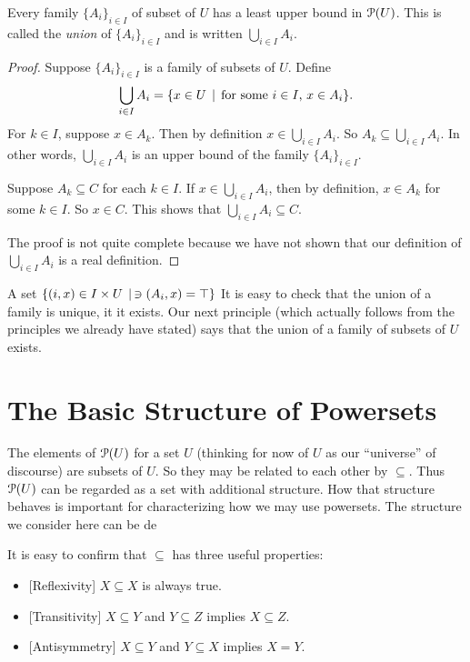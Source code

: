 \begin{lemma}
	Every family $\{A_i\}_{i\in I}$ of subset of $U$ has a least upper bound in ${\mathcal{P}}(U)$.
	This is called the \emph{union} of $\{A_i\}_{i\in I}$ and is written $\bigcup_{i\in I}A_i$.
	
	\begin{proof}
		Suppose $\{A_i\}_{i\in I}$ is a family of subsets of $U$. 
		Define 
		\[\bigcup_{i\in I}A_i = \{x\in U\,\mid\, \text{for some $i\in I$, $x\in A_i$}\}.\]
		For $k\in I$, suppose $x\in A_k$.
		Then by definition $x\in \bigcup_{i\in I}A_i$.
		So $A_k\subseteq \bigcup_{i\in I}A_i$.
		In other words, $\bigcup_{i\in I}A_i$ is an upper bound of the family $\{A_i\}_{i\in I}$.
		
		Suppose $A_k\subseteq C$ for each $k\in I$.
		If $x\in\bigcup_{i\in I}A_i$, then by definition, $x\in A_k$ for some $k\in I$.
		So $x\in C$.
		This shows that $\bigcup_{i\in I}A_i\subseteq C$.
		
		The proof is not quite complete because we have not shown that
		our definition of $\bigcup_{i\in I}A_i$ is a real definition.
	\end{proof}
\end{lemma}

A set $\{(i,x)\in I\times U\,\mid\, \ni(A_i,x)=\top\}$
It is easy to check that the union of a family is unique, it it exists. Our next principle (which actually follows from the principles we already have stated)
says that the union of a family of subsets of $U$ exists.



\section{The Basic Structure of Powersets}

The elements of ${\mathcal{P}}(U)$ for a set $U$ (thinking for now of $U$ as our
``universe'' of discourse) are subsets of $U$.
So they may be related to each other by $\subseteq$. 
Thus ${\mathcal{P}}(U)$ can be regarded as a set with additional structure. 
How that structure behaves is important for characterizing how we may use powersets. The structure we consider here can be de

It is easy to confirm that $\subseteq$ has three useful properties:
\begin{itemize}
	\item{}[Reflexivity] $X\subseteq X$ is always true.
	\item{}[Transitivity] $X\subseteq Y$ and $Y\subseteq Z$ implies $X\subseteq Z$.
	\item{}[Antisymmetry] $X\subseteq Y$ and $Y\subseteq X$ implies $X=Y$.
\end{itemize}

